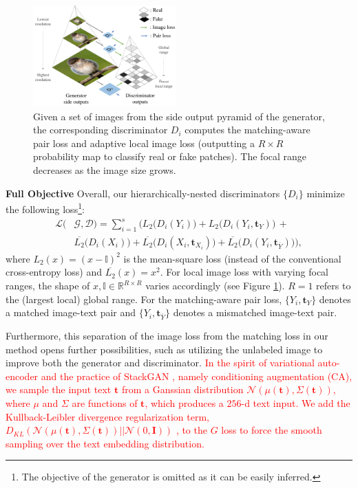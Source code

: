 \documentclass[10pt,twocolumn,letterpaper]{article}
\begin{document}
\begin{figure}[t]
	\centering
	\includegraphics[width=0.49\textwidth]{figure/loss.pdf}
	\vspace{-.5cm}
	\caption{Given a set of images from the side output pyramid of the generator, the corresponding discriminator $D_i$ computes the matching-aware pair loss and adaptive local image loss (outputting a $R{\times}R$ probability map to classify real or fake patches). The focal range decreases as the image size grows. }  \vspace{-.3cm}
	\label{fig:loss}
\end{figure}


\textbf{Full Objective } Overall, our hierarchically-nested discriminators $\{D_i\}$ minimize the following loss\footnote{The objective of the generator is omitted as it can be easily inferred.}:
\vspace{-.2cm}
\begin{equation}
\begin{split}
\mathcal{L}(& \mathcal{G}, \mathcal{D})  = \sum_{i=1}^{s} \Big(  L_2\big(D_i({Y}_i)\big) +  L_2\big(D_i({Y}_i, \bm t_{Y})\big) \, + \\ 
& \overline{L_2}\big(D_i({X}_i)\big)  + \overline{L_2}\big(D_i({X}_i, \bm{t}_{X_i})\big) + \overline{L_2}\big(D_i({Y}_i,  \bm{t}_{\overline{Y}})\big) \Big),
\end{split}
\end{equation}
where $L_2(x) = (x - \mathbb{I})^2$ is the mean-square loss (instead of the conventional cross-entropy loss) and $\overline{L_2}(x) =x^2$. For local image loss with varying focal ranges, the shape of $x, \mathbb{I} \in \mathbb{R}^{R{\times}R}$ varies accordingly (see Figure \ref{fig:loss}). $R=1$ refers to the (largest local) global range. For the matching-aware pair loss, 
$\{Y_i, \bm t_{Y}\}$ denotes a matched image-text pair and $\{Y_i, \bm{t}_{\overline{Y}}\}$ denotes a mismatched image-text pair.

Furthermore, this separation of the image loss from the matching loss in our method opens further possibilities, such as utilizing the unlabeled image to improve both the generator and discriminator.
\textcolor{red}{In the spirit of variational auto-encoder \cite{vae} and the practice of StackGAN \cite{han2017stackgan}, namely conditioning augmentation (CA), we sample the input text $\bm t$ from a Ganssian distribution $\mathcal{N}(\mu({\bm t}), \Sigma({\bm t}))$, where $\mu$ and $\Sigma$ are functions of $\bm t$, which produces a $256$-d text input.
We add the Kullback-Leibler divergence regularization term, $D_{KL}(\mathcal{N}(\mu({\bm t}), \Sigma({\bm t}) )|| \mathcal{N}(0, \bm{I}))$ \cite{vae}, to the $G$ loss to force the smooth sampling over the text embedding distribution. }
\end{document}

